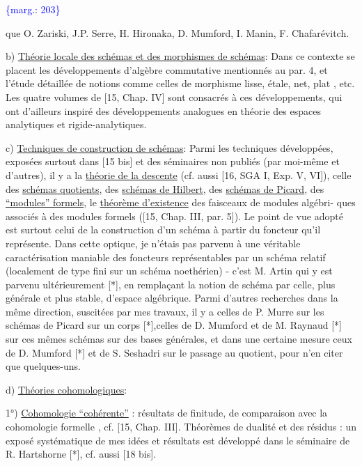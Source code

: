 \documentclass[11pt]{article}
\newcommand{\scanpage}[1]{\par\bigskip\noindent{\small\sffamily[scan #1]}\par}
\newcommand{\mspage}[1]{{\small\sffamily[p.\,#1]}}
\newcommand{\margin}[1]{\textcolor{blue}{\{\textsf{marg.:} #1\}}}
\newcommand{\uline}[1]{\underline{#1}}
\begin{document}
\margin{203}

\clearpage
\scanpage{119/204}
\mspage{- 9 -}

que O. Zariski, J.P. Serre, H. Hironaka, D. Mumford, I. Manin, F. Chafarévitch.

b) \uline{Théorie locale des schémas et des morphismes de schémas}: Dans ce contexte
se placent les développements d'algèbre commutative mentionnés au par. 4, et
l'étude détaillée de notions comme celles de morphisme lisse, étale, net, plat ,
etc. Les quatre volumes de [15, Chap. IV] sont consacrés à ces développements,
qui ont d'ailleurs inspiré des développements analogues en théorie des espaces
analytiques et rigide-analytiques.

c) \uline{Techniques de construction de schémas}: Parmi les techniques développées,
exposées surtout dans [15 bis] et des séminaires non publiés (par moi-même et
d'autres), il y a la \uline{théorie de la descente} (cf. aussi [16, SGA I, Exp. V, VI]),
celle des \uline{schémas quotients}, des \uline{schémas de Hilbert}, des \uline{schémas de Picard},
des \uline{``modules'' formels}, le \uline{théorème d'existence} des faisceaux de modules algébri-%
ques associés à des modules formels ([15, Chap. III, par. 5]). Le point de vue
adopté est surtout celui de la construction d'un schéma à partir du foncteur
qu'il représente. Dans cette optique, je n'étais pas parvenu à une véritable
caractérisation maniable des foncteurs représentables par un schéma relatif
(localement de type fini sur un schéma noethérien) - c'est M. Artin qui y est
parvenu ultérieurement [*], en remplaçant la notion de schéma par celle, plus
générale et plus stable, d'espace algébrique. Parmi d'autres recherches dans
la même direction, suscitées par mes travaux, il y a celles de P. Murre sur les
schémas de Picard sur un corps [*],celles de D. Mumford et de M. Raynaud [*]
sur ces mêmes schémas sur des bases générales, et dans une certaine mesure
ceux de D. Mumford [*] et de S. Seshadri sur le passage au quotient, pour n'en
citer que quelques-uns.

d) \uline{Théories cohomologiques}:

1°) \uline{Cohomologie ``cohérente''} : résultats de finitude, de comparaison avec la
cohomologie formelle , cf. [15, Chap. III]. Théorèmes de dualité et des résidus :
un exposé systématique de mes idées et résultats est développé dans le séminaire
de R. Hartshorne [*], cf. aussi [18 bis].
\end{document}
